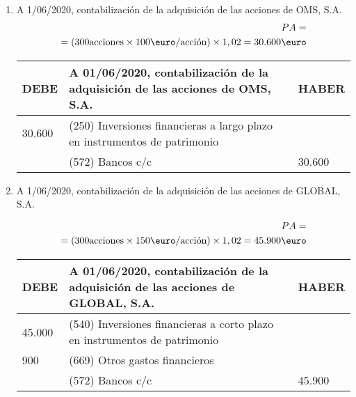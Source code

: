 \begin{enumerate}[label=\alph*)]
    \item A 1/06/2020, contabilización de la adquisición de las acciones de OMS, S.A.
    \begin{align*}
        PA = \\ 
        = (300 \text{acciones} \times 100 \text{\euro/acción}) \times 1,02 = 30.600 \text{\euro}
    \end{align*}
    \begin{table}[H]
        \centering
        \begin{tabular}{|p{3cm}|p{6cm}|p{3cm}|}
        \hline
        \rowcolor{blue!30}
        \textbf{DEBE} & \textbf{A 01/06/2020, contabilización de la adquisición de las acciones de OMS, S.A.} & \textbf{HABER} \\
        \hline
        30.600 & (250) Inversiones financieras a largo plazo en instrumentos de patrimonio & \\
        \hline
        & (572) Bancos c/c & 30.600 \\
        \hline
        \end{tabular}
    \end{table}
    \item A 1/06/2020, contabilización de la adquisición de las acciones de GLOBAL, S.A.
    
    \begin{align*}
        PA = \\ 
        = (300 \text{acciones} \times 150 \text{\euro/acción}) \times 1,02 = 45.900 \text{\euro}
    \end{align*}

    \begin{table}[H]
        \centering
        \begin{tabular}{|p{3cm}|p{6cm}|p{3cm}|}
        \hline
        \rowcolor{blue!30}
        \textbf{DEBE} & \textbf{A 01/06/2020, contabilización de la adquisición de las acciones de GLOBAL, S.A.} & \textbf{HABER} \\
        \hline
        45.000 & (540) Inversiones financieras a corto plazo en instrumentos de patrimonio & \\
        \hline
        900 & (669) Otros gastos financieros & \\
        \hline
        & (572) Bancos c/c & 45.900 \\
        \hline
        \end{tabular}
    \end{table}


\end{enumerate}
